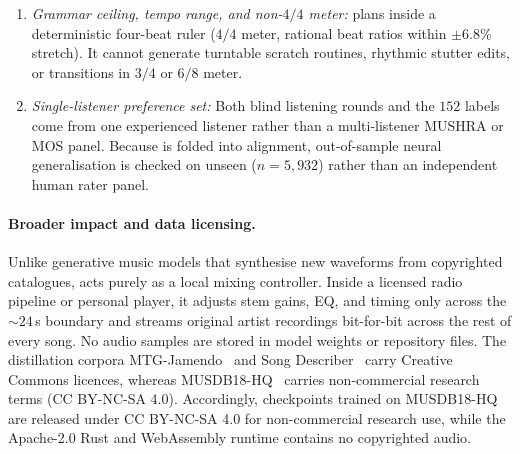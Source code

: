 \begin{enumerate}
  \item \emph{Grammar ceiling, tempo range, and non-$4/4$ meter:}  plans inside a deterministic four-beat ruler ($4/4$ meter, rational beat ratios within $\pm 6.8\%$ stretch). It cannot generate turntable scratch routines, rhythmic stutter edits, or transitions in $3/4$ or $6/8$ meter.
  \item \emph{Single-listener preference set:} Both blind listening rounds and the $152$  labels come from one experienced listener rather than a multi-listener MUSHRA or MOS panel. Because  is folded into  alignment, out-of-sample neural generalisation is checked on unseen  ($n=5{,}932$) rather than an independent human rater panel.
\end{enumerate}

\paragraph{Broader impact and data licensing.}
Unlike generative music models that synthesise new waveforms from copyrighted catalogues, \sone{} acts purely as a local mixing controller. Inside a licensed radio pipeline or personal player, it adjusts stem gains, EQ, and timing only across the $\sim 24$\,s boundary and streams original artist recordings bit-for-bit across the rest of every song. No audio samples are stored in model weights or repository files. The distillation corpora MTG-Jamendo~\citep{bogdanov2019mtg} and Song Describer~\citep{manco2023song} carry Creative Commons licences, whereas MUSDB18-HQ~\citep{MUSDB18HQ} carries non-commercial research terms (CC BY-NC-SA 4.0). Accordingly, checkpoints trained on MUSDB18-HQ are released under CC BY-NC-SA 4.0 for non-commercial research use, while the Apache-2.0 Rust and WebAssembly runtime contains no copyrighted audio.
